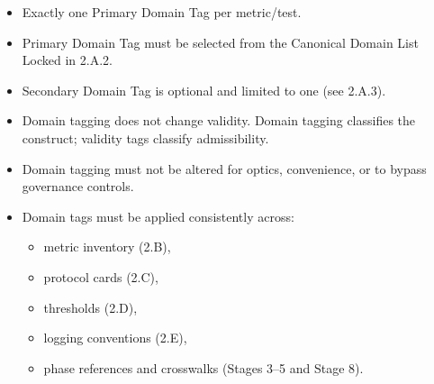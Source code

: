 \documentclass[10pt]{article}
\begin{document}
\begin{itemize}
\item Exactly one Primary Domain Tag per metric/test.
\item Primary Domain Tag must be selected from the Canonical Domain List Locked in 2.A.2.
\item Secondary Domain Tag is optional and limited to one (see 2.A.3).
\item Domain tagging does not change validity. Domain tagging classifies the construct; validity tags classify admissibility.
\item Domain tagging must not be altered for optics, convenience, or to bypass governance controls.
\item Domain tags must be applied consistently across:
  \begin{itemize}
  \item metric inventory (2.B),
  \item protocol cards (2.C),
  \item thresholds (2.D),
  \item logging conventions (2.E),
  \item phase references and crosswalks (Stages 3–5 and Stage 8).
  \end{itemize}
\end{itemize}
\end{document}
